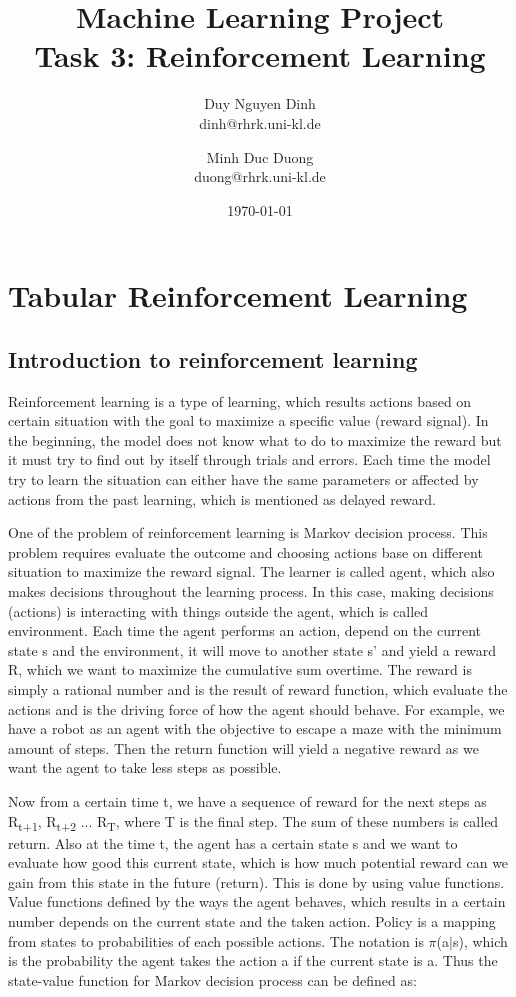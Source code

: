 \documentclass[11pt]{article}
\title{Machine Learning Project\\Task 3: Reinforcement Learning}
\author{Duy Nguyen Dinh \\ dinh@rhrk.uni-kl.de\and
	Minh Duc Duong\\ duong@rhrk.uni-kl.de\and
}
\date{\today}
\begin{document}
\maketitle

\section{Tabular Reinforcement Learning}

\subsection{Introduction to reinforcement learning}
Reinforcement learning is a type of learning, which results actions based on certain situation with the goal to maximize a specific value (reward signal). In the beginning, the model does not know what to do to maximize the reward but it must try to find out by itself through trials and errors. Each time the model try to learn the situation can either have the same parameters or affected by actions from the past learning, which is mentioned as delayed reward.

One of the problem of reinforcement learning is Markov decision process. This problem requires evaluate the outcome and choosing actions base on different situation to maximize the reward signal. The learner is called agent, which also makes decisions throughout the learning process. In this case, making decisions (actions) is interacting with things outside the agent, which is called environment. Each time the agent performs an action, depend on the current state s and the environment, it will move to another state s' and yield a reward R, which we want to maximize the cumulative sum overtime. The reward is simply a rational number and is the result of reward function, which evaluate the actions and is the driving force of how the agent should behave. For example, we have a robot as an agent with the objective to escape a maze with the minimum amount of steps. Then the return function will yield a negative reward as we want the agent to take less steps as possible.

Now from a certain time t, we have a sequence of reward for the next steps as R\textsubscript{t+1},  R\textsubscript{t+2} ... R\textsubscript{T}, where T is the final step. The sum of these numbers is called return. Also at the time t, the agent has a certain state s and we want to evaluate how good this current state, which is how much potential reward can we gain from this state in the future (return). This is done by using value functions. Value functions defined by the ways the agent behaves, which results in a certain number depends on the current state and the taken action. Policy is a mapping from states to probabilities of each possible actions. The notation is $\pi$(a$\vert$s), which is the probability the agent takes the action a if the current state is a. Thus the state-value function for Markov decision process can be defined as:
\end{document}
